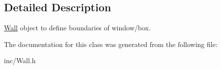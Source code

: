 \subsection{Detailed Description}
\hyperlink{class_wall}{Wall} object to define boundaries of window/box. 

The documentation for this class was generated from the following file\-:\begin{DoxyCompactItemize}
\item 
inc/Wall.\-h\end{DoxyCompactItemize}
